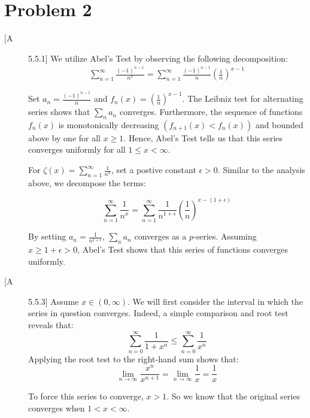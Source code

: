 \documentclass[12pt]{article}%
\newcommand{\infsum}[1][0]{\sum^{\infty}_{n = {#1}}}
\begin{document}
\section{Problem 2}
\begin{description}
  \item[[A] 5.5.1]
  We utilize Abel's Test by observing the following decomposition:
  \begin{align*}
        \infsum[1] \frac{(-1)^{n-1}}{n^x} = \infsum[1] \frac{(-1)^{n-1}}{n} \left(\frac{1}{n}\right)^{x-1}
  \end{align*}

  Set $a_n = \frac{(-1)^{n-1}}{n}$ and $f_n(x) = \left(\frac{1}{n}\right)^{x-1}$. The Leibniz test for alternating series shows that $\sum_n a_n$ converges. Furthermore, the sequence of functions $f_n(x)$ is monotonically decreasing $(f_{n+1}(x) < f_{n}(x))$ and bounded above by one for all $x \geq 1$. Hence, Abel's Test tells us that this series converges uniformly for all $1 \leq x < \infty$.


  For $\zeta(x) = \infsum[1] \frac{1}{n^x}$, set a postive constant $\epsilon > 0$. Similar to the analysis above, we decompose the terms:

  \begin{equation*}
    \infsum[1] \frac{1}{n^x} = \infsum[1] \frac{1}{n^{1 + \epsilon}} \left(\frac{1}{n}\right)^{x - (1 + \epsilon)}
  \end{equation*}

  By setting $a_n = \frac{1}{n^{1 + \epsilon}}$, $\sum_n a_n$ converges as a $p$-series. Assuming $x \geq 1+\epsilon > 0$, Abel's Test shows that this series of functions converges uniformly.

  \item[[A] 5.5.3]
  Assume $x \in (0, \infty)$. We will first consider the interval in which the series in question converges. Indeed, a simple comparison and root test reveals that:
  \begin{equation*}
      \infsum \frac{1}{1 + x^n} \leq \infsum \frac{1}{x^n}
  \end{equation*}
  Applying the root test to the right-hand sum shows that:
  \begin{equation*}
    \lim_{n \rightarrow \infty} \frac{x^n}{x^{n+1}} =  \lim_{n \rightarrow \infty} \frac{1}{x} = \frac{1}{x}
  \end{equation*}

  To force this series to converge, $x > 1$. So we know that the original series converges when $1 < x < \infty$.


\end{description}
\end{document}
